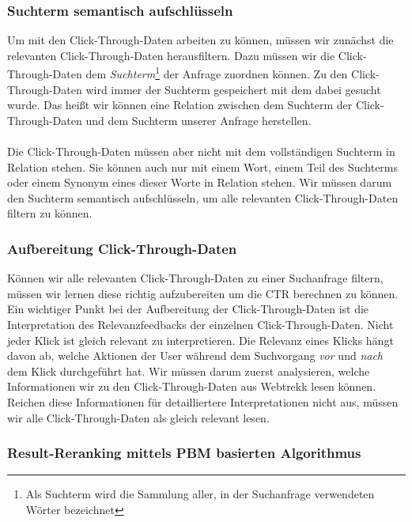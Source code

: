 \subsubsection{Suchterm semantisch aufschlüsseln}
\label{sec:Einfuehrung:Methodik:SuchtermSegmentierung}

Um mit den Click-Through-Daten arbeiten zu können, müssen wir zunächst die relevanten Click-Through-Daten herausfiltern. Dazu müssen wir die Click-Through-Daten dem \textit{Suchterm}\footnote{Als Suchterm wird die Sammlung aller, in der Suchanfrage verwendeten Wörter bezeichnet} der Anfrage zuordnen können. Zu den Click-Through-Daten wird immer der Suchterm gespeichert mit dem dabei gesucht wurde. Das heißt wir können eine Relation zwischen dem Suchterm der Click-Through-Daten und dem Suchterm unserer Anfrage herstellen.
\\
\\
Die Click-Through-Daten müssen aber nicht mit dem vollständigen Suchterm in Relation stehen. Sie können auch nur mit einem Wort, einem Teil des Suchterms oder einem Synonym eines dieser Worte in Relation stehen. Wir müssen darum den Suchterm semantisch aufschlüsseln, um alle relevanten Click-Through-Daten filtern zu können. 

\subsubsection{Aufbereitung Click-Through-Daten}
\label{sec:Einfuehrung:Methodik:Click-Through-Daten}

Können wir alle relevanten Click-Through-Daten zu einer Suchanfrage filtern, müssen wir lernen diese richtig aufzubereiten um die CTR berechnen zu können.  Ein wichtiger Punkt bei der Aufbereitung der Click-Through-Daten ist die Interpretation des Relevanzfeedbacks der einzelnen Click-Through-Daten. Nicht jeder Klick ist gleich relevant zu interpretieren. Die Relevanz eines Klicks hängt davon ab, welche Aktionen der User während dem Suchvorgang \textit{vor} und \textit{nach} dem Klick durchgeführt hat. Wir müssen darum zuerst analysieren, welche Informationen wir zu den Click-Through-Daten aus Webtrekk lesen können.  Reichen diese Informationen für detailliertere Interpretationen nicht aus, müssen wir alle Click-Through-Daten als gleich relevant lesen.

\subsubsection{Result-Reranking mittels PBM basierten Algorithmus}
\label{sec:Einfuehrung:Methodik:Result-RerankingPBM}

